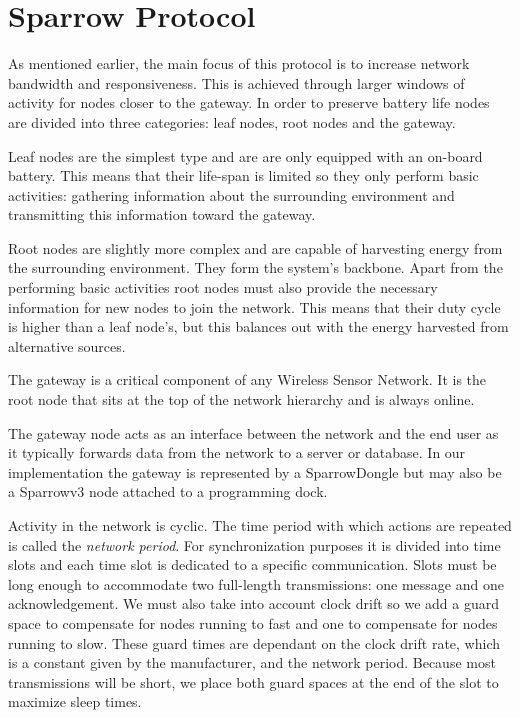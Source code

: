 
\chapter{Sparrow Protocol}

As mentioned earlier, the main focus of this protocol is to increase network
bandwidth and responsiveness. This is achieved through larger windows of
activity for nodes closer to the gateway. In order to preserve battery life
nodes are divided into three categories: leaf nodes, root nodes and the
gateway. 

Leaf nodes are the simplest type and are are only equipped with an
on-board battery. This means that their life-span is limited so they 
only perform basic activities: gathering information about the surrounding
environment and transmitting this information toward the gateway. 

Root nodes are slightly more complex and are capable of harvesting energy from
the surrounding environment. They form the system's backbone. Apart from the
performing basic activities root nodes must also provide the necessary
information for new nodes to join the network. This means that their duty cycle
is higher than a leaf node's, but this balances out with the energy harvested
from alternative sources.

The gateway is a critical component of any Wireless Sensor Network. It is the
root node that sits at the top of the network hierarchy and is always online.

The gateway node acts as an interface between the network and the end user as
it typically forwards data from the network to a server or database. In our
implementation the gateway is represented by a SparrowDongle but may also be a
Sparrowv3 node attached to a programming dock.

Activity in the network is cyclic. The time period with which actions are
repeated is called the \emph{network period}. For synchronization purposes it
is divided into time slots and each time slot is dedicated to a specific
communication. Slots must be long enough to accommodate two full-length
transmissions: one message and one acknowledgement. We must also take into
account clock drift so we add a guard space to compensate for nodes running to
fast and one to compensate for nodes running to slow. These guard times are
dependant on the clock drift rate, which is a constant given by the
manufacturer, and the network period. Because most transmissions will be short,
we place both guard spaces at the end of the slot to maximize sleep times.

